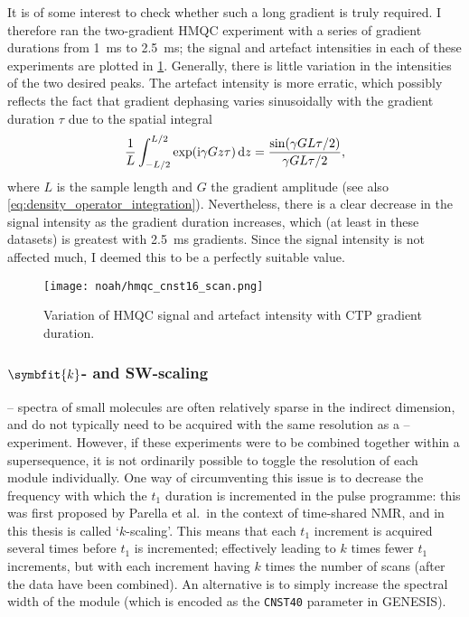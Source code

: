 It is of some interest to check whether such a long gradient is truly required.
I therefore ran the two-gradient HMQC experiment with a series of gradient durations from \qty{1}{\ms} to \qty{2.5}{\ms}; the signal and artefact intensities in each of these experiments are plotted in \cref{fig:hmqc_cnst16}.
Generally, there is little variation in the intensities of the two desired peaks.
The artefact intensity is more erratic, which possibly reflects the fact that gradient dephasing varies sinusoidally with the gradient duration $\tau$ due to the spatial integral
\begin{equation}
    \label{eq:gradient_dephasing}
    \frac{1}{L} \int_{-L/2}^{L/2} \exp(\mathrm{i} \gamma Gz\tau)\,\mathrm{d}z = \frac{\sin(\gamma G L\tau/2)}{\gamma GL\tau/2},
\end{equation}
where $L$ is the sample length and $G$ the gradient amplitude (see also \cref{eq:density_operator_integration}).
Nevertheless, there is a clear decrease in the signal intensity as the gradient duration increases, which (at least in these datasets) is greatest with \qty{2.5}{\ms} gradients.
Since the signal intensity is not affected much, I deemed this to be a perfectly suitable value.

\begin{figure}[!ht]
    \centering
    \texttt{[image: noah/hmqc\_cnst16\_scan.png]}%
    \caption[Variation of HMQC signal and artefact intensity with CTP gradient duration]{
        Variation of HMQC signal and artefact intensity with CTP gradient duration.
    }
    \label{fig:hmqc_cnst16}
\end{figure}



\subsubsection{$\symbfit{k}$- and SW-scaling}

\proton{}--\nitrogen{} spectra of small molecules are often relatively sparse in the indirect dimension, and do not typically need to be acquired with the same resolution as a \proton{}--\carbon{} experiment.
However, if these experiments were to be combined together within a supersequence, it is not ordinarily possible to toggle the resolution of each module individually.
One way of circumventing this issue is to decrease the frequency with which the \nitrogen{} $t_1$ duration is incremented in the pulse programme: this was first proposed by Parella et al.\ in the context of time-shared NMR\autocite{PerezTrujillo2007MRC,Parella2010CMR}, and in this thesis is called `$k$-scaling'.
This means that each $t_1$ increment is acquired several times before $t_1$ is incremented; effectively leading to $k$ times fewer $t_1$ increments, but with each increment having $k$ times the number of scans (after the data have been combined).
An alternative is to simply increase the spectral width of the \nitrogen{} module (which is encoded as the \texttt{CNST40} parameter in GENESIS).

